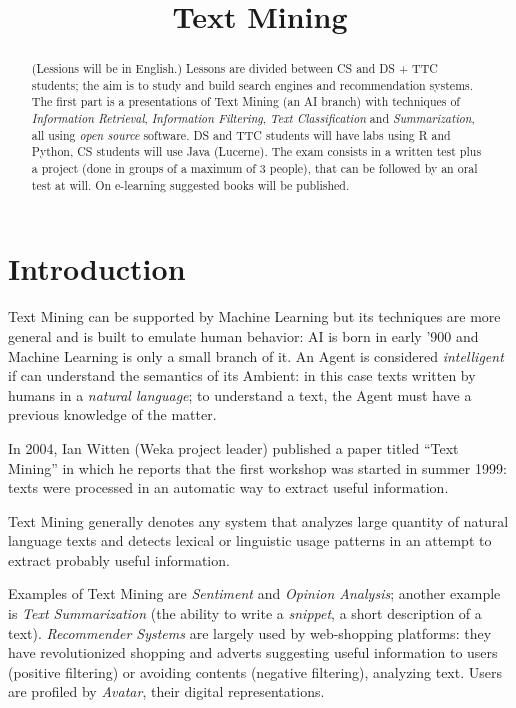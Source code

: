 \documentclass[11pt, a4page]{article}
\title{\textbf{Text Mining}}
\author{}
\date{}
\begin{document}
\maketitle
\begin{abstract}
  (Lessions will be in English.)
  Lessons are divided between CS and DS + TTC students; the aim is to study and build search engines and recommendation systems.
  The first part is a presentations of Text Mining (an AI branch) with techniques of \textit{Information Retrieval}, \textit{Information Filtering}, \textit{Text Classification} and \textit{Summarization}, all using \textit{open source} software.
  DS and TTC students will have labs using R and Python, CS students will use Java (Lucerne).
  The exam consists in a written test plus a project (done in groups of a maximum of 3 people), that can be followed by an oral test at will.
  On e-learning suggested books will be published.
\end{abstract}
\tableofcontents

\part{Introduction}
Text Mining can be supported by Machine Learning but its techniques are more general and is built to emulate human behavior: AI is born in early '900 and Machine Learning is only a small branch of it.
An Agent is considered \textit{intelligent} if can understand the semantics of its Ambient: in this case texts written by humans in a \textit{natural language}; to understand a text, the Agent must have a previous knowledge of the matter.

In 2004, Ian Witten (Weka project leader) published a paper titled ``Text Mining'' in which he reports that the first workshop was started in summer 1999: texts were processed in an automatic way to extract useful information.

Text Mining generally denotes any system that analyzes large quantity of natural language texts and detects lexical or linguistic usage patterns in an attempt to extract probably useful information.

Examples of Text Mining are \textit{Sentiment} and \textit{Opinion Analysis}; another example is \textit{Text Summarization} (the ability to write a \textit{snippet}, a short description of a text).
\textit{Recommender Systems} are largely used by web-shopping platforms: they have revolutionized shopping and adverts suggesting useful information to users (positive filtering) or avoiding contents (negative filtering), analyzing text.
Users are profiled by \textit{Avatar}, their digital representations.
\end{document}
